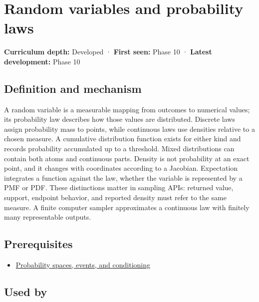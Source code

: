 \hypertarget{appendix-4d0203f7944f}{}\label{referencestart:appendix-4d0203f7944f}
\section{Random variables and probability laws}\label{appendix-4d0203f7944f-random-variables-and-probability-laws}

\textbf{Curriculum depth:} Developed · \textbf{First seen:} Phase 10 · \textbf{Latest development:} Phase 10

\begin{allmightroledefinition}

\subsection{Definition and mechanism}\label{appendix-4d0203f7944f-definition-and-mechanism}

A random variable is a measurable mapping from outcomes to numerical values; its probability law describes how those values are distributed. Discrete laws assign probability mass to points, while continuous laws use densities relative to a chosen measure. A cumulative distribution function exists for either kind and records probability accumulated up to a threshold. Mixed distributions can contain both atoms and continuous parts. Density is not probability at an exact point, and it changes with coordinates according to a Jacobian. Expectation integrates a function against the law, whether the variable is represented by a PMF or PDF. These distinctions matter in sampling APIs: returned value, support, endpoint behavior, and reported density must refer to the same measure. A finite computer sampler approximates a continuous law with finitely many representable outputs.

\end{allmightroledefinition}

\subsection{Prerequisites}\label{appendix-4d0203f7944f-prerequisites}

\begin{itemize}
\tightlist
\item
  \hyperref[appendix-f1ef323f6ed7]{Probability spaces, events, and conditioning}
\end{itemize}

\subsection{Used by}\label{appendix-4d0203f7944f-used-by}

